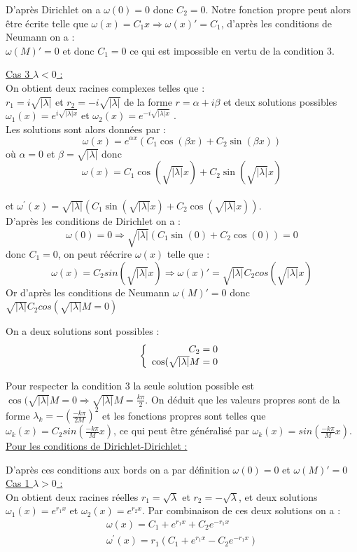 \documentclass[fleqn,10pt]{SelfArx}
\begin{document}
D'après Dirichlet on a $\omega(0)=0$  donc $C_2=0$. Notre fonction propre peut alors être écrite telle que $\omega(x)=C_1x\Rightarrow \omega(x)\prime=C_1$, d'après les conditions de Neumann on a :\\
$\omega(M)'=0 $ et donc $C_1=0$ ce qui est impossible en vertu de la condition 3.

\underline{Cas 3  $\lambda < 0$ :}\\
On obtient deux racines complexes telles que : \\
$r_1 = i\sqrt{|\lambda|} $ et $r_2 = -i\sqrt{|\lambda|}$ de la forme $r = \alpha + i\beta$ et deux solutions possibles $\omega_1(x)= e^{i\sqrt{|\lambda|x}}$ et $\omega_2(x)= e^{-i\sqrt{|\lambda|x}}$ .\\
Les solutions sont alors données par :
$$ \omega(x) = e^{\alpha x}(C_1 \cos(\beta x) + C_2 \sin(\beta x) ) $$
où $\alpha = 0$ et $\beta = \sqrt{|\lambda|}$ donc $$\omega(x) =C_1 \cos(\sqrt{|\lambda|} x) + C_2 \sin(\sqrt{|\lambda|} x)$$ \\
et $\omega^\prime(x) =\sqrt{|\lambda|}(C_1 \sin(\sqrt{|\lambda|} x) + C_2 \cos(\sqrt{|\lambda|} x)) $. \\
D'après les conditions de Dirichlet on a :
$$ \omega(0)=0 \Rightarrow \sqrt{|\lambda|}(C_1 \sin(0) + C_2 \cos(0)) =0$$
donc $C_1=0$, on peut réécrire $\omega(x)$ telle que : 
$$\omega(x) = C_2 sin(\sqrt{|\lambda|}x)\Rightarrow \omega(x)' = \sqrt{|\lambda|}C_2cos(\sqrt{|\lambda|}x)$$
Or d'après les conditions de Neumann $\omega(M)'=0$ donc \\
$\sqrt{|\lambda|}C_2cos(\sqrt{|\lambda|}M=0)$

On a deux solutions sont possibles :
\[
\left\{
\begin{array}{r c l}
C_2 =0\\
\cos(\sqrt{|\lambda |}M  =0
\end{array}
\right.
\]

Pour respecter la condition 3 la seule solution possible est $\cos(\sqrt{|\lambda |}M =0 \Rightarrow \sqrt{|\lambda |}M = \frac{k\pi}{2} $. On déduit que les valeurs propres sont de la forme $\lambda_k =- (\frac{-k\pi}{2M})^2$ et les fonctions propres sont telles que $\omega_k(x)=C_2 sin (\frac{-k\pi}{M}x)$, ce qui peut être généralisé par $\omega_k(x)= sin (\frac{-k\pi}{M}x)$.\\

\underline{Pour les conditions de Dirichlet-Dirichlet :}

D'après ces conditions aux bords on a par définition $\omega(0)=0$ et $\omega(M)\prime =0$\\
\underline{Cas 1  $\lambda > 0$ :}\\
On obtient deux racines réelles $r_1 = \sqrt{\lambda}$ et  $r_2 = -\sqrt{\lambda}$, et deux solutions $\omega_1(x)= e^{r_1x}$ et $\omega_2(x)= e^{r_2x}$. Par combinaison de ces deux solutions on a :
\begin{align*}
\omega(x) =C_1+ e^{r_1x}+ C_2e^{-r_1x}\\
\omega^\prime(x) = r_1(C_1 + e^{r_1x} - C_2e^{-r_1x})
\end{align*}
\end{document}

